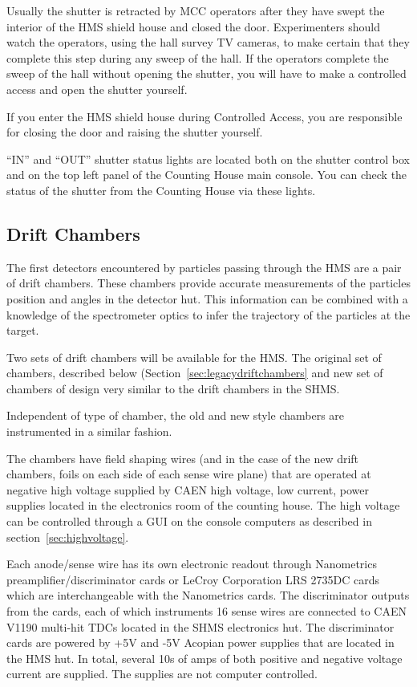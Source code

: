 {Usually the shutter is retracted by MCC operators after they have
swept the interior of the HMS shield house and closed the
door. Experimenters should watch the operators, using the hall survey
TV cameras, to make certain that they complete this step during any
sweep of the hall. If the operators complete the sweep of the hall
without opening the shutter, you will have to make a controlled access
and open the shutter yourself.

If you enter the HMS shield house during Controlled Access, you are
responsible for closing the door and raising the shutter yourself.

``IN'' and ``OUT'' shutter status lights are located both on the
shutter control box and on the top left panel of the Counting House
main console. You can check the status of the shutter from the
Counting House via these lights.



\subsection{Drift Chambers}
The first detectors encountered by particles passing through the HMS
are a pair of drift chambers.  These chambers
provide accurate measurements of the particles
position and angles in the detector hut. This information can be combined
with a knowledge of the spectrometer optics to infer the trajectory of the
particles at the target.

Two sets of drift chambers will be available for the HMS.  The
original set of chambers, described below
(Section~\ref{sec:legacydriftchambers} and new set of chambers of
design very similar to the drift chambers in the SHMS.

Independent of type of chamber, the old and new style chambers are
instrumented in a similar fashion.

The chambers have field shaping wires (and in the case of the new
drift chambers, foils on each side of each sense wire plane) that are
operated at negative high voltage supplied by CAEN high voltage, low
current, power supplies located in the electronics room of the
counting house.  The high voltage can be controlled through a GUI on
the console computers as described in section~\ref{sec:highvoltage}.

Each anode/sense wire has its own electronic readout through
Nanometrics preamplifier/discriminator cards or LeCroy Corporation LRS
2735DC cards which are interchangeable with the Nanometrics cards.
The discriminator outputs from the cards, each of which instruments 16
sense wires are connected to CAEN V1190 multi-hit TDCs located in the
SHMS electronics hut.
The discriminator cards are powered by +5V and -5V Acopian power
supplies that are
located in the HMS hut.  In total, several 10s of amps of both positive
and negative voltage current are supplied.  The supplies are not
computer controlled.

}
